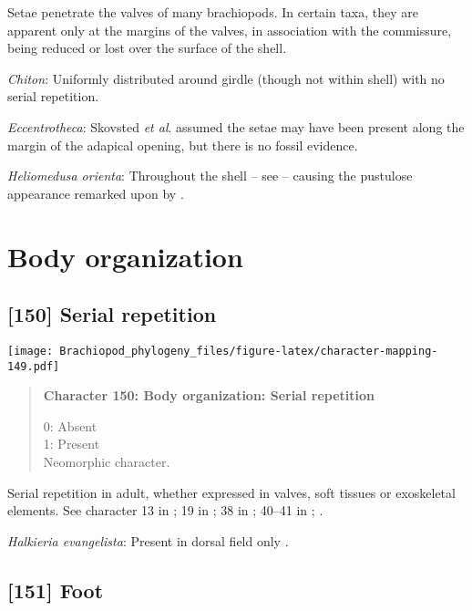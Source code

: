 \documentclass[openany]{book}
\theoremstyle{definition}
\theoremstyle{definition}
\theoremstyle{definition}
\theoremstyle{remark}
\begin{document}
Setae penetrate the valves of many brachiopods. In certain taxa, they
are apparent only at the margins of the valves, in association with the
commissure, being reduced or lost over the surface of the shell.

\hypertarget{Chiton-coding-149}{}
\emph{Chiton}: Uniformly distributed around girdle (though not within
shell) with no serial repetition.

\hypertarget{Eccentrotheca-coding-149}{}
\emph{Eccentrotheca}: Skovsted \emph{et al}.
\citeyearpar{Skovsted2011Scleritomeconstruction} assumed the setae may
have been present along the margin of the adapical opening, but there is
no fossil evidence.

\hypertarget{Heliomedusa_orienta-coding-149}{}
\emph{Heliomedusa orienta}: Throughout the shell -- see
\citet{Williams2007Supplement} -- causing the pustulose appearance
remarked upon by \citet{Chen2007Reinterpretationof}.

\section{Body organization}\label{body-organization}

\subsection*{{[}150{]} Serial repetition}\label{serial-repetition}

\texttt{[image: Brachiopod\_phylogeny\_files/figure-latex/character-mapping-149.pdf]}

\begin{quote}
\textbf{Character 150: Body organization: Serial repetition}

0: Absent\\
1: Present\\
Neomorphic character.
\end{quote}

Serial repetition in adult, whether expressed in valves, soft tissues or
exoskeletal elements. See character 13 in \citet{Rouse1999}; 19 in
\citet{Vinther2008}; 38 in \citet{Haszprunar1996}; 40--41 in
\citet{Sutton2012}; \citet{Wanninger2009}.

\hypertarget{Halkieria_evangelista-coding-150}{}
\emph{Halkieria evangelista}: Present in dorsal field only
\citep{Zhao2017}.

\subsection*{{[}151{]} Foot}\label{foot-1}
\end{document}

